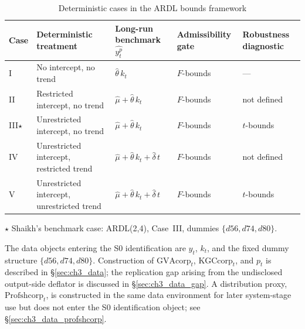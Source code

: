 \documentclass[11pt,a4paper]{article}
\begin{document}
\begin{table}[!ht]
	\centering
	\small
	\caption{Deterministic cases in the ARDL bounds framework}
	\label{tab:pss_cases_yp}
	\begin{tabular}{p{0.8cm}p{3.6cm}p{4.2cm}p{2.0cm}p{2.5cm}}
		\hline\hline
		Case & Deterministic treatment
		& Long-run benchmark $\widehat{y_t^p}$
		& Admissibility gate
		& Robustness diagnostic \\
		\hline
		I   & No intercept, no trend
		& $\widehat{\theta}\,k_t$
		& $F$-bounds & --- \\[2pt]
		II  & Restricted intercept, no trend
		& $\widehat{\mu} + \widehat{\theta}\,k_t$
		& $F$-bounds & not defined \\[2pt]
		III$\star$
		& Unrestricted intercept, no trend
		& $\widehat{\mu} + \widehat{\theta}\,k_t$
		& $F$-bounds & $t$-bounds \\[2pt]
		IV  & Unrestricted intercept, restricted trend
		& $\widehat{\mu} + \widehat{\theta}\,k_t + \widehat{\delta}\,t$
		& $F$-bounds & not defined \\[2pt]
		V   & Unrestricted intercept, unrestricted trend
		& $\widehat{\mu} + \widehat{\theta}\,k_t + \widehat{\delta}\,t$
		& $F$-bounds & $t$-bounds \\
		\hline
	\end{tabular}
	\par\vspace{0.3em}
	\footnotesize $\star$ Shaikh's benchmark case: ARDL(2,4), Case~III,
	dummies $\{d56, d74, d80\}$.
\end{table}


The data objects entering the S0 identification are $y_t$, $k_t$, and the
fixed dummy structure $\{d56, d74, d80\}$. Construction of
$\text{GVAcorp}_t$, $\text{KGCcorp}_t$, and $p_t$ is described in
\S\ref{sec:ch3_data}; the replication gap arising from the undisclosed
output-side deflator is discussed in \S\ref{sec:ch3_data_gap}. A
distribution proxy, $\text{Profshcorp}_t$, is constructed in the same data
environment for later system-stage use but does not enter the S0
identification object; see \S\ref{sec:ch3_data_profshcorp}.

\end{document}
